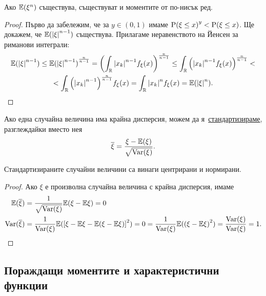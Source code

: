 \documentclass[numbers=endperiod, DIV=15, bibliography=totocnumbered]{scrartcl}
\begin{document}
\begin{proposition}\label{thm:lower-order-moments}
  Ако $\mathbb{E}(\xi^n)$ съществува, съществуват и моментите от по-нисък ред.
\end{proposition}
\begin{proof}
  Първо да забележим, че за $y \in (0, 1)$ имаме ${\operatorname{P}(\xi \leq x)}^y < \operatorname{P}(\xi \leq x)$. Ще докажем, че $\mathbb{E}({\left\vert \xi \right\vert}^{n-1})$ съществува. Прилагаме неравенството на Йенсен за риманови интеграли:
  \begin{multline*}
    \mathbb{E}({\left\vert \xi \right\vert}^{n-1})
    \leq
    {\mathbb{E}({\left\vert \xi \right\vert}^{n-1})}^{\frac n {n-1}}
    =
    {\left( \int_{\mathbb{R}} {\left\vert x_k \right\vert}^{n-1} f_\xi(x) \right)}^{\frac n {n-1}}
    \leq
    \int_{\mathbb{R}} {\left({\left\vert x_k \right\vert}^{n-1} f_\xi(x) \right)}^{\frac n {n-1}}
    < \\ <
    \int_{\mathbb{R}} {\left({\left\vert x_k \right\vert}^{n-1}\right)}^{\frac n {n-1}} f_\xi(x)
    =
    \int_{\mathbb{R}} {\left\vert x_k \right\vert}^n f_\xi(x)
    =
    \mathbb{E}({\left\vert \xi \right\vert}^n).
  \end{multline*}
\end{proof}

\begin{definition}
  Ако една случайна величина има крайна дисперсия, можем да я~\uline{стандартизираме}, разглеждайки вместо нея
  \begin{displaymath}
    \overline \xi = \frac {\xi - \mathbb{E}(\xi)} {\sqrt{\operatorname{Var}(\xi)}}.
  \end{displaymath}
\end{definition}

\begin{proposition}
  Стандартизираните случайни величини са винаги центрирани и нормирани.
\end{proposition}
\begin{proof}
  Ако $\xi$ е произволна случайна величина с крайна дисперсия, имаме
  \begin{align*}
    \mathbb{E}(\overline \xi)
    &=
    \frac 1 {\sqrt{\operatorname{Var}(\xi)}} \mathbb{E}(\xi - \mathbb{E}\xi)
    =
    0
    \\
    \operatorname{Var}(\overline \xi)
    &=
    \frac 1 {\operatorname{Var}(\xi)} \mathbb{E}({\left[ \xi - \mathbb{E}\xi - \mathbb{E}(\xi - \mathbb{E}\xi) \right]}^2) = 0
    =
    \frac 1 {\operatorname{Var}(\xi)} \mathbb{E}({(\xi - \mathbb{E}\xi)}^2)
    =
    \frac {\operatorname{Var}(\xi)} {\operatorname{Var}(\xi)}
    =
    1.
  \end{align*}
\end{proof}

\subsection{Пораждащи моментите и характеристични функции}
\end{document}
